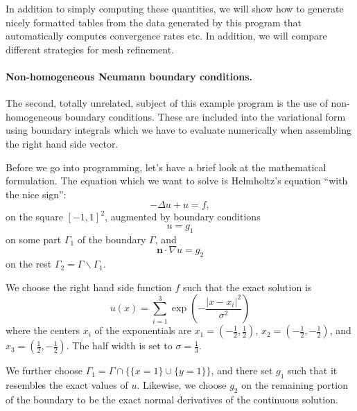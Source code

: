 \documentclass{article}
\begin{document}
In addition to simply computing these quantities, we will show how to generate
nicely formatted tables from the data generated by this program that
automatically computes convergence rates etc. In addition, we will compare
different strategies for mesh refinement.


\paragraph{Non-homogeneous Neumann boundary conditions.} The second, totally
unrelated, subject of this example program is the use of non-homogeneous
boundary conditions. These are included into the variational form using
boundary integrals which we have to evaluate numerically when assembling the
right hand side vector.

Before we go into programming, let's have a brief look at the mathematical
formulation. The equation which we want to solve is Helmholtz's equation
``with the nice sign'':
$$
  -\Delta u + u = f,
$$
on the square $[-1,1]^2$, augmented by boundary conditions
$$
  u = g_1
$$
on some part $\Gamma_1$ of the boundary $\Gamma$, and
$$
  {\mathbf n}\cdot \nabla u = g_2
$$
on the rest $\Gamma_2 = \Gamma \backslash \Gamma_1$.

We choose the right hand side function $f$ such that the exact solution is
$$
  u(x) = \sum_{i=1}^3 \exp\left(-\frac{|x-x_i|^2}{\sigma^2}\right)
$$
where the centers $x_i$ of the exponentials are 
  $x_1=(-\frac 12,\frac 12)$,
  $x_2=(-\frac 12,-\frac 12)$, and
  $x_3=(\frac 12,-\frac 12)$.
The half width is set to $\sigma=\frac 13$.

We further choose $\Gamma_1=\Gamma \cap\{\{x=1\} \cup \{y=1\}\}$, and there
set $g_1$ such that it resembles the exact values of $u$. Likewise, we choose
$g_2$ on the remaining portion of the boundary to be the exact normal
derivatives of the continuous solution.
\end{document}
